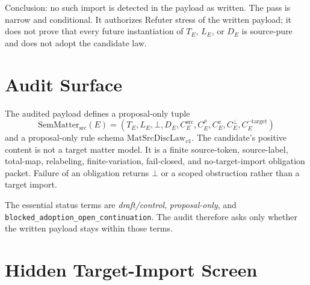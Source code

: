 \documentclass[11pt]{article}
\newcommand{\MatSrcDiscLaw}{\mathrm{MatSrcDiscLaw}_{v1}}
\newcommand{\SemMatterSrc}{\mathrm{SemMatter}_{\mathrm{src}}}
\newcommand{\Bottom}{\bot}
\begin{document}
Conclusion: no such import is detected in the payload as written.  The pass is
narrow and conditional.  It authorizes Refuter stress of the written payload;
it does not prove that every future instantiation of \(T_E\), \(L_E\), or
\(D_E\) is source-pure and does not adopt the candidate law.

\section{Audit Surface}

The audited payload defines a proposal-only tuple
\[
  \SemMatterSrc(E)=
  (T_E,L_E,\Bottom,D_E,C^{\mathrm{src}}_E,C^{\rho}_E,C^v_E,C^\bot_E,C^{\neg\mathrm{target}}_E)
\]
and a proposal-only rule schema \(\MatSrcDiscLaw\).  The candidate's positive
content is not a target matter model.  It is a finite source-token, source-label,
total-map, relabeling, finite-variation, fail-closed, and no-target-import
obligation packet.  Failure of an obligation returns \(\Bottom\) or a scoped
obstruction rather than a target import.

The essential status terms are \emph{draft/control}, \emph{proposal-only}, and
\texttt{blocked\_adoption\_open\_continuation}.  The audit therefore asks only
whether the written payload stays within those terms.

\section{Hidden Target-Import Screen}
\end{document}
